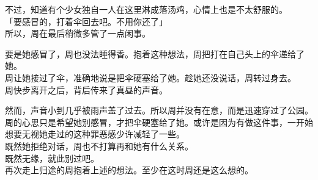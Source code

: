 不过，知道有个少女独自一人在这里淋成落汤鸡，心情上也是不太舒服的。\\

「要感冒的，打着伞回去吧。不用你还了」\\

所以，周在最后稍微多管了一点闲事。

要是她感冒了，周也没法睡得香。抱着这种想法，周把打在自己头上的伞递给了她。\\

周让她接过了伞，准确地说是把伞硬塞给了她。趁她还没说话，周转过身去。\\

周快步离开之后，背后传来了真昼的声音。

然而，声音小到几乎被雨声盖了过去。所以周并没有在意，而是迅速穿过了公园。\\

周的心思只是希望她别感冒，才把伞硬塞给了她。或许是因为有做这件事，一开始想要无视她走过的这种罪恶感少许减轻了一些。\\

既然她拒绝对话，周也不打算再和她有什么关系。\\

既然无缘，就此别过吧。\\

再次走上归途的周抱着上述的想法。至少在这时周还是这么想的。
